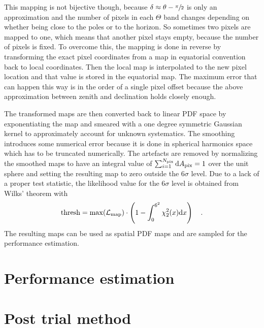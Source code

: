 This mapping is not bijective though, because $\delta \approx \theta - \sfrac{\pi}{2}$ is only an approximation and the number of pixels in each $\Theta$ band changes depending on whether being close to the poles or to the horizon.
So sometimes two pixels are mapped to one, which means that another pixel stays empty, because the number of pixels is fixed.
To overcome this, the mapping is done in reverse by transforming the exact pixel coordinates from a map in equatorial convention back to local coordinates.
Then the local map is interpolated to the new pixel location and that value is stored in the equatorial map.
The maximum error that can happen this way is in the order of a single pixel offset because the above approximation between zenith and declination holds closely enough.

The transformed maps are then converted back to linear PDF space by exponentiating the map and smeared with a one degree symmetric Gaussian kernel to approximately account for unknown systematics.
The smoothing introduces some numerical error because it is done in spherical harmonics space which has to be truncated numerically.
The artefacts are removed by normalizing the smoothed maps to have an integral value of $\sum_{i=1}^{N_\text{pix}} \mathrm{d}A_\text{pix} = 1$ over the unit sphere and setting the resulting map to zero outside the $6\sigma$ level.
Due to a lack of a proper test statistic, the likelihood value for the $6\sigma$ level is obtained from Wilks' theorem with
\begin{equation}
  \text{thresh} =
    \max(\mathcal{L}_\text{map})\cdot
    \left(1 - \int_0^{6^2}\chi^2_{2}(x)\mathrm{d}x\right)
  \quad\text{.}
\end{equation}
The resulting maps can be used as spatial PDF maps and are sampled for the performance estimation.

\section{Performance estimation}

\section{Post trial method}

